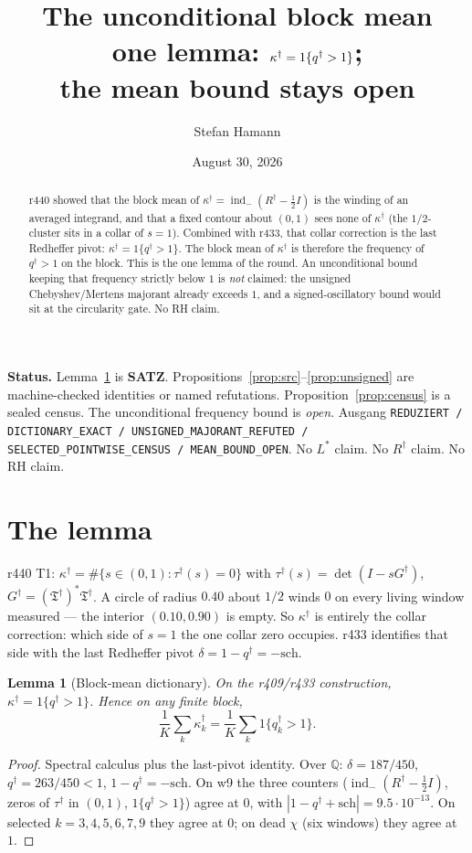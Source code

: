 \documentclass[11pt]{article}
\title{\bfseries The unconditional block mean\\[2mm]
\large one lemma: $\kapd=1\{\qd>1\}$;\\
the mean bound stays open}
\author{Stefan Hamann}
\date{August 30, 2026}
\newtheorem{lemma}{Lemma}
\theoremstyle{remark}
\newcommand{\Rd}{R^{\dagger}}
\newcommand{\qd}{q^{\dagger}}
\newcommand{\kapd}{\kappa^{\dagger}}
\newcommand{\taud}{\tau^{\dagger}}
\newcommand{\Gd}{G^{\dagger}}
\newcommand{\Td}{\mathfrak{T}^{\dagger}}
\newcommand{\indm}{\operatorname{ind}_{-}}
\newcommand{\half}{\tfrac12}
\begin{document}
\maketitle

\begin{abstract}\noindent
r440 showed that the block mean of
$\kapd=\indm(\Rd-\half I)$ is the winding of an averaged
integrand, and that a fixed contour about $(0,1)$ sees
none of $\kapd$ (the $1/2$-cluster sits in a collar of
$s=1$).  Combined with r433, that collar correction is
the last Redheffer pivot: $\kapd=1\{\qd>1\}$.
The block mean of $\kapd$ is therefore the frequency of
$\qd>1$ on the block.  This is the one lemma of the
round.  An unconditional bound keeping that frequency
strictly below $1$ is \emph{not} claimed: the unsigned
Chebyshev/Mertens majorant already exceeds $1$, and a
signed-oscillatory bound would sit at the circularity
gate.  No RH claim.
\end{abstract}

\medskip\noindent
\textbf{Status.}\enspace
Lemma~\ref{lem:dict} is \textbf{SATZ}.
Propositions~\ref{prop:src}--\ref{prop:unsigned} are
machine-checked identities or named refutations.
Proposition~\ref{prop:census} is a sealed census.
The unconditional frequency bound is \emph{open}.
Ausgang
\texttt{REDUZIERT / DICTIONARY\_EXACT / UNSIGNED\_MAJORANT\_REFUTED / SELECTED\_POINTWISE\_CENSUS / MEAN\_BOUND\_OPEN}.
No $L^{*}$ claim.  No $R^{\dagger}$ claim.  No RH claim.

\section{The lemma}\label{sec:lemma}

r440 T1: $\kapd=\#\{s\in(0,1):\taud(s)=0\}$ with
$\taud(s)=\det(I-s\Gd)$, $\Gd=(\Td)^{*}\Td$.
A circle of radius $0.40$ about $1/2$ winds $0$ on every
living window measured --- the interior $(0.10,0.90)$ is
empty.  So $\kapd$ is entirely the collar correction:
which side of $s=1$ the one collar zero occupies.
r433 identifies that side with the last Redheffer pivot
$\delta=1-\qd=-\mathrm{sch}$.

\begin{lemma}[Block-mean dictionary]\label{lem:dict}
On the r409/r433 construction,
$\kapd=1\{\qd>1\}$.
Hence on any finite block,
\[
\frac1K\sum_{k}\kapd_{k}
=\frac1K\sum_{k}1\{\qd_{k}>1\}.
\]
\end{lemma}

\begin{proof}
Spectral calculus plus the last-pivot identity.
Over $\mathbb{Q}$: $\delta=187/450$, $\qd=263/450<1$,
$1-\qd=-\mathrm{sch}$.
On w9 the three counters
($\indm(\Rd-\half I)$, zeros of $\taud$ in $(0,1)$,
$1\{\qd>1\}$) agree at $0$, with
$|1-\qd+\mathrm{sch}|=9.5\cdot 10^{-13}$.
On selected $k=3,4,5,6,7,9$ they agree at $0$;
on dead $\chi$ (six windows) they agree at $1$.
\end{proof}
\end{document}
